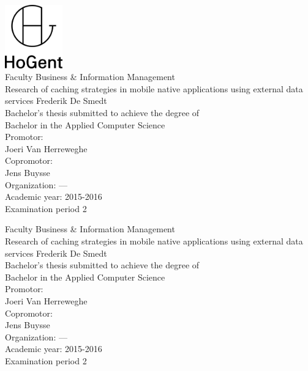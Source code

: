 \documentclass[pdftex,a4paper,12pt,twoside]{report}
\newcommand{\emptypage}{
\newpage
\thispagestyle{empty}
\mbox{}
\newpage
}
\newcommand{\student}{Frederik De Smedt}
\newcommand{\promotor}{Joeri Van Herreweghe}
\newcommand{\copromotor}{Jens Buysse}
\newcommand{\instelling}{---}
\newcommand{\titel}{Research of caching strategies in mobile native applications using external data services}
\newcommand{\faculteit}{Faculty Business \& Information Management}
\newcommand{\rapporttype}{Bachelor's thesis submitted to achieve the degree of\\Bachelor in the Applied Computer Science}
\newcommand{\academiejaar}{2015-2016}
\newcommand{\examenperiode}{Examination period 2}
\begin{document}

\begin{titlepage}
  \begin{center}

    \begingroup
    \rmfamily
    \includegraphics[width=2.5cm]{img/HG-beeldmerk-woordmerk}\\[.5cm]
    \faculteit\\[3cm]
    \titel
    \vfill
    \student\\[3.5cm]
    \rapporttype\\[2cm]
    Promotor:\\
    \promotor\\
    Copromotor:\\
    \copromotor\\[2.5cm]
    Organization: \instelling\\[.5cm]
    Academic year: \academiejaar\\[.5cm]
    \examenperiode
    \endgroup

  \end{center}
  \restoregeometry
\end{titlepage}


\emptypage


\begin{titlepage}
  \begin{center}

    \begingroup
    \rmfamily
    \faculteit\\[3cm]
    \titel
    \vfill
    \student\\[3.5cm]
    \rapporttype\\[2cm]
    Promotor:\\
    \promotor\\
    Copromotor:\\
    \copromotor\\[2.5cm]
    Organization: \instelling\\[.5cm]
    Academic year: \academiejaar\\[.5cm]
    \examenperiode
    \endgroup

  \end{center}
  \restoregeometry
\end{titlepage}
\end{document}
